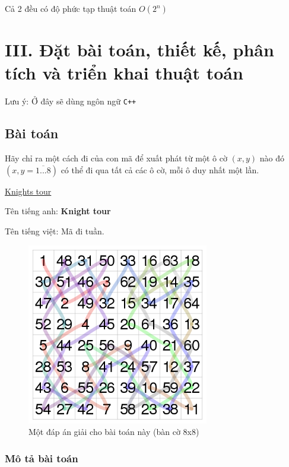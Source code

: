 \documentclass[
]{article}
\begin{document}
Cả 2 đều có độ phức tạp thuật toán \(O(2^n)\)

\hypertarget{iii.-ux111ux1eb7t-buxe0i-touxe1n-thiux1ebft-kux1ebf-phuxe2n-tuxedch-vuxe0-triux1ec3n-khai-thuux1eadt-touxe1n}{%
\section{III. Đặt bài toán, thiết kế, phân tích và triển khai thuật
toán}\label{iii.-ux111ux1eb7t-buxe0i-touxe1n-thiux1ebft-kux1ebf-phuxe2n-tuxedch-vuxe0-triux1ec3n-khai-thuux1eadt-touxe1n}}

Lưu ý: Ở đây sẽ dùng ngôn ngữ \texttt{C++}

\hypertarget{buxe0i-touxe1n-1}{%
\subsection{Bài toán}\label{buxe0i-touxe1n-1}}

Hãy chỉ ra một cách đi của con mã để xuất phát từ một ô cờ \((x,y)\) nào
đó \((x,y=\overline{1...8})\) có thể đi qua tất cả các ô cờ, mỗi ô duy
nhất một lần.

\href{https://en.wikipedia.org/wiki/Knight\textquotesingle{}s_tour}{Knight\textquotesingle s
tour}

Tên tiếng anh: \textbf{Knight tour}

Tên tiếng việt: Mã đi tuần.

\begin{figure}
\centering
\includegraphics[width=3.125in,height=3.125in]{Homework 5 Trial and Error 3b646dc8160042df9d000a4baa7eeb4e/Untitled.png}
\caption{Một đáp án giải cho bài toán này (bàn cờ 8x8)}
\end{figure}

\hypertarget{muxf4-tux1ea3-buxe0i-touxe1n}{%
\subsubsection{Mô tả bài toán}\label{muxf4-tux1ea3-buxe0i-touxe1n}}
\end{document}
